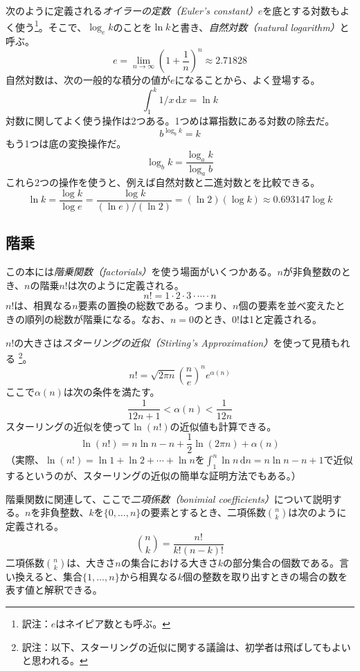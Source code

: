 %
%
次のように定義される\emph{オイラーの定数（Euler's constant）}$e$を底とする対数もよく使う\footnote{訳注：$e$はネイピア数とも呼ぶ。}。そこで、$\log_e k$のことを$\ln k$と書き、\emph{自然対数（natural logarithm）}と呼ぶ。%
%
\[
   e = \lim_{n\rightarrow\infty} \left(1+\frac{1}{n}\right)^n
   \approx  2.71828
\]
自然対数は、次の一般的な積分の値が$e$になることから、よく登場する。
\[
    \int_{1}^{k} 1/x\,\mathrm{d}x  = \ln k
\]
対数に関してよく使う操作は2つある。1つめは冪指数にある対数の除去だ。
\[
    b^{\log_b k} = k
\]
もう1つは底の変換操作だ。
\[
    \log_b k = \frac{\log_a k}{\log_a b}
\]
これら2つの操作を使うと、例えば自然対数と二進対数とを比較できる。
\[
   \ln k = \frac{\log k}{\log e} = \frac{\log k}{(\ln e)/(\ln 2)} =
    (\ln 2)(\log k) \approx 0.693147\log k
\]

\subsection{階乗}

この本には\emph{階乗関数（factorials）}を使う場面がいくつかある。$n$が非負整数のとき、$n$の階乗$n!$は次のように定義される。
\[
   n! = 1\cdot2\cdot3\cdot\cdots\cdot n
\]
$n!$は、相異なる$n$要素の置換の総数である。つまり、$n$個の要素を並べ変えたときの順列の総数が階乗になる。なお、$n=0$のとき、$0!$は1と定義される。

%
$n!$の大きさは\emph{スターリングの近似（Stirling's Approximation）}を使って見積もれる
\footnote{訳注：以下、スターリングの近似に関する議論は、初学者は飛ばしてもよいと思われる。}。%
\[
  n!
   = \sqrt{2\pi n}\left(\frac{n}{e}\right)^{n}e^{\alpha(n)}
\]
ここで$\alpha(n)$は次の条件を満たす。
\[
   \frac{1}{12n+1} <  \alpha(n) < \frac{1}{12n}
\]
スターリングの近似を使って$\ln(n!)$の近似値も計算できる。
\[
   \ln(n!) = n\ln n - n + \frac{1}{2}\ln(2\pi n) + \alpha(n)
\]
（実際、$\ln(n!)=\ln 1 + \ln 2  + \cdots + \ln n$を$\int_1^n \ln n\,\mathrm{d}n = n\ln n - n +1$で近似するというのが、スターリングの近似の簡単な証明方法でもある。）

%
階乗関数に関連して、ここで\emph{二項係数（bonimial coefficients）}について説明する。$n$を非負整数、$k$を$\{0,\ldots,n\}$の要素とするとき、二項係数$\binom{n}{k}$は次のように定義される。
\[
   \binom{n}{k} = \frac{n!}{k!(n-k)!}
\]
二項係数$\binom{n}{k}$は、大きさ$n$の集合における大きさ$k$の部分集合の個数である。言い換えると、集合$\{1,\ldots,n\}$から相異なる$k$個の整数を取り出すときの場合の数を表す値と解釈できる。 %

